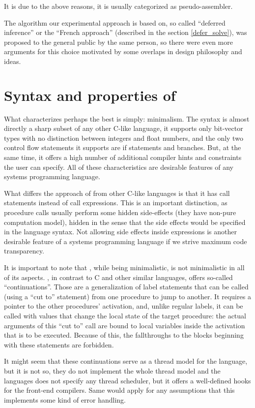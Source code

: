 It is due to the above reasons, it is usually categorized as pseudo-assembler.

The algorithm our experimental approach is based on, so called ``deferred inference'' or the ``French approach'' (described in the section \ref{defer_solve}), was proposed to the general public by the same person, so there were even more arguments for this choice motivated by some overlaps in design philosophy and ideas.

\section{Syntax and properties of \cmm}

What characterizes \cmm perhaps the best is simply: minimalism. The syntax is almost directly a sharp subset of any other C-like language, it supports only bit-vector types with no distinction between integers and float numbers, and the only two control flow statements it supports are if statements and branches. But, at the same time, it offers a high number of additional compiler hints and constraints the user can specify. All of these characteristics are desirable features of any systems programming language.

What differs the approach of \cmm from other C-like languages is that it has call statements instead of call expressions. This is an important distinction, as procedure calls usually perform some hidden side-effects (they have non-pure computation model), hidden in the sense that the side effects would be specified in the language syntax. Not allowing side effects inside expressions is another desirable feature of a systems programming language if we strive maximum code transparency.

It is important to note that \cmm, while being minimalistic, is not minimalistic in all of its aspects. \cmm, in contrast to C and other similar languages, offers so-called ``continuations''. Those are a generalization of label statements that can be called (using a ``cut to'' statement) from one procedure to jump to another. It requires a pointer to the other procedures' activation, and, unlike regular labels, it can be called with values that change the local state of the target procedure: the actual arguments of this ``cut to'' call are bound to local variables inside the activation that is to be executed. Because of this, the fallthroughs to the blocks beginning with these statements are forbidden.

It might seem that these continuations serve as a thread model for the language, but it is not so, they do not implement the whole thread model and the languages does not specify any thread scheduler, but it offers a well-defined hooks for the front-end compilers. Same would apply for any assumptions that this implements some kind of error handling.


